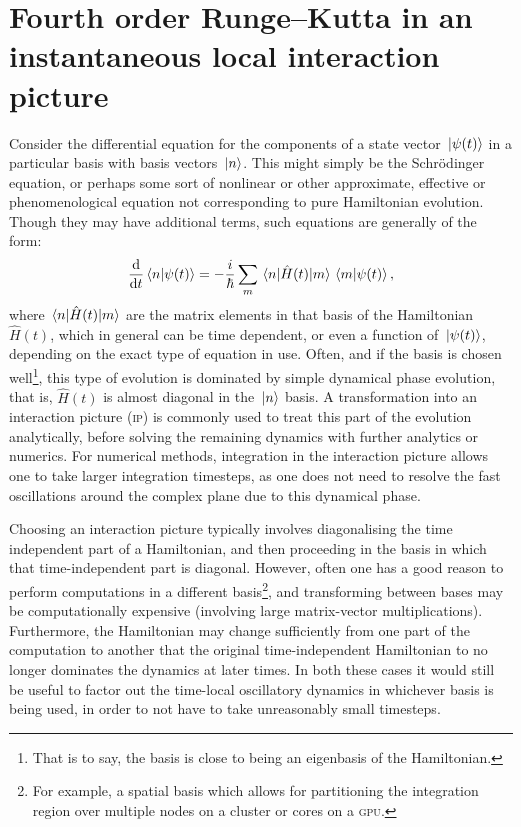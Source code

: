 \section{Fourth order Runge--Kutta in an instantaneous local interaction picture}

Consider the differential equation for the components of a state vector $\ket{\psi(t)}$ in a particular basis with basis vectors $\ket{n}$. This might simply be the Schr\"odinger equation, or perhaps some sort of nonlinear or other approximate, effective or phenomenological equation not corresponding to pure Hamiltonian evolution. Though they may have additional terms, such equations are generally of the form:
\begin{align}\label{eq:real_imag}
\dv t \braket{n}{\psi(t)} = -\frac i \hbar \sum_m \matrixel{n}{\hat H(t)}{m} \braket{m}{\psi(t)},
\end{align}
where $\matrixel{n}{\hat H(t)}{m}$ are the matrix elements in that basis of the Hamiltonian $\hat H(t)$, which in general can be time dependent, or even a function of $\ket{\psi(t)}$, depending on the exact type of equation in use. Often, and if the basis is chosen well\footnote{That is to say, the basis is close to being an eigenbasis of the Hamiltonian.}, this type of evolution is dominated by simple dynamical phase evolution, that is, $\hat H(t)$ is almost diagonal in the $\ket{n}$ basis. A transformation into an interaction picture (\textsc{ip}) is commonly used to treat this part of the evolution analytically, before solving the remaining dynamics with further analytics or numerics. For numerical methods, integration in the interaction picture allows one to take larger integration timesteps, as one does not need to resolve the fast oscillations around the complex plane due to this dynamical phase.

Choosing an interaction picture typically involves diagonalising the time independent part of a Hamiltonian, and then proceeding in the basis in which that time-independent part is diagonal. However, often one has a good reason to perform computations in a different basis\footnote{For example, a spatial basis which allows for partitioning the integration region over multiple nodes on a cluster or cores on a \textsc{gpu}.}, and transforming between bases may be computationally expensive (involving large matrix-vector multiplications). Furthermore, the Hamiltonian may change sufficiently from one part of the computation to another that the original time-independent Hamiltonian to no longer dominates the dynamics at later times. In both these cases it would still be useful to factor out the time-local oscillatory dynamics in whichever basis is being used, in order to not have to take unreasonably small timesteps.

